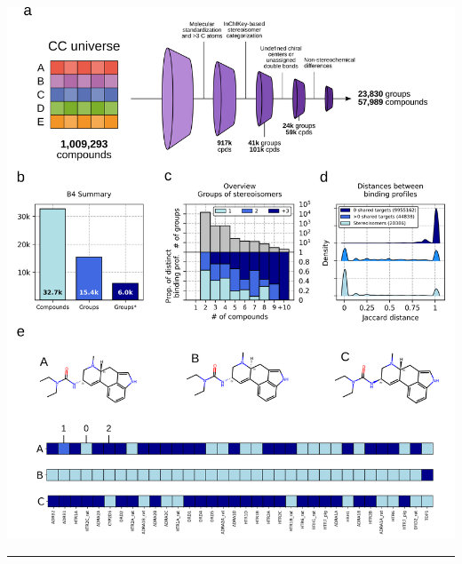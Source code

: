 \begin{Figure_modified}
  \centering
  \includegraphics[width=1\linewidth]{figures/Stereoisomers/Main/Fig1_v2.png}
  \caption{
    \textbf{Stereoisomerism and bioactivity.}
    \textbf{a)} Computational pipeline to identify groups of stereoisomers in the CC universe.
    \textbf{b)} Number of unique stereoisomeric compounds with experimentally identified protein targets in the CC B4 space, number of stereoisomer groups, and number of groups with at least 2 compounds with non-identical binding profiles.
    \textbf{c)} Number of groups (y-axis, top) having the specified number of stereoisomers (x-axis). Proportion of these groups (y-axis, bottom) having the specified number of distinct binding profiles (i.e. \textasciitilde60\% of the groups of 2 isomers have a unique binding profile).
    \textbf{d)} Distributions of Jaccard distances (binding profiles) between pairs of compounds sharing 0, ≥1 targets and stereoisomer pairs. All distributions are significantly different from each other (Mann-Whitney p-value\textasciitilde0).
    \textbf{e)} Illustrative example of a stereoisomer group including 3 small molecules with their corresponding target binding profiles, using the annotation of type 0 signatures (i.e. 0: no binding; 1: weak binding and 2: strong binding).
  }
  \vspace{-5mm}
  \rule[0ex]{\textwidth}{0.5pt}
  \vspace{-9mm}
  \label{Stereoisomers_Fig1}
\end{Figure_modified}




